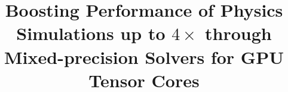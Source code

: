 \documentclass[runningheads]{llncs}
\begin{document}
\title{Boosting Performance of Physics Simulations up to $4\times$ through Mixed-precision Solvers	for GPU Tensor Cores
}

\begin{comment}
\author{Azzam Haidar\inst{1}  \and David Green\inst{3}, Stanimire Tomov\inst{2}, Ed D'Azevedo\inst{3}, Wael Elwasif\inst{3}, Graham Lopez\inst{3}, Tyler McDaniel\inst{3}, Lin Mu\inst{3}\and \\ Jack Dongarra\inst{2,3,4}}
\authorrunning{Haidar, Green, Tomov, D'Azevedo, Elwasif, Lopez, McDaniel, Mu, Dongarra}
\tocauthor{Haidar, Green, Tomov, D'Azevedo, Elwasif, Lopez, McDaniel, Mu, Dongarra}
\institute{NVIDIA USA, \and University of Tennessee, USA \and Oak Ridge National Laboratory, USA \and University of Manchester, UK}
\end{comment}

\maketitle









\begin{comment}
\section*{Acknowledgments}
This research was supported by the Exascale Computing Project
(17-SC-20-SC), a collaborative effort of the U.S. Department of Energy
Office of Science and the National Nuclear Security Administration. The
work was also partially supported by Nvidia and NSF grant No. OAC-1740250.
\end{comment}

%


\end{document}
